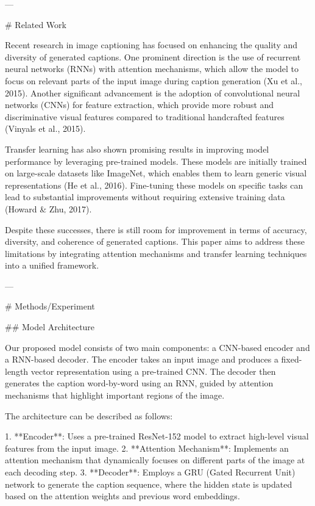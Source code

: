 ---

# Related Work

Recent research in image captioning has focused on enhancing the quality and diversity of generated captions. One prominent direction is the use of recurrent neural networks (RNNs) with attention mechanisms, which allow the model to focus on relevant parts of the input image during caption generation (Xu et al., 2015). Another significant advancement is the adoption of convolutional neural networks (CNNs) for feature extraction, which provide more robust and discriminative visual features compared to traditional handcrafted features (Vinyals et al., 2015).

Transfer learning has also shown promising results in improving model performance by leveraging pre-trained models. These models are initially trained on large-scale datasets like ImageNet, which enables them to learn generic visual representations (He et al., 2016). Fine-tuning these models on specific tasks can lead to substantial improvements without requiring extensive training data (Howard & Zhu, 2017).

Despite these successes, there is still room for improvement in terms of accuracy, diversity, and coherence of generated captions. This paper aims to address these limitations by integrating attention mechanisms and transfer learning techniques into a unified framework.

---

# Methods/Experiment

## Model Architecture

Our proposed model consists of two main components: a CNN-based encoder and a RNN-based decoder. The encoder takes an input image and produces a fixed-length vector representation using a pre-trained CNN. The decoder then generates the caption word-by-word using an RNN, guided by attention mechanisms that highlight important regions of the image.

The architecture can be described as follows:

1. **Encoder**: Uses a pre-trained ResNet-152 model to extract high-level visual features from the input image.
2. **Attention Mechanism**: Implements an attention mechanism that dynamically focuses on different parts of the image at each decoding step.
3. **Decoder**: Employs a GRU (Gated Recurrent Unit) network to generate the caption sequence, where the hidden state is updated based on the attention weights and previous word embeddings.

